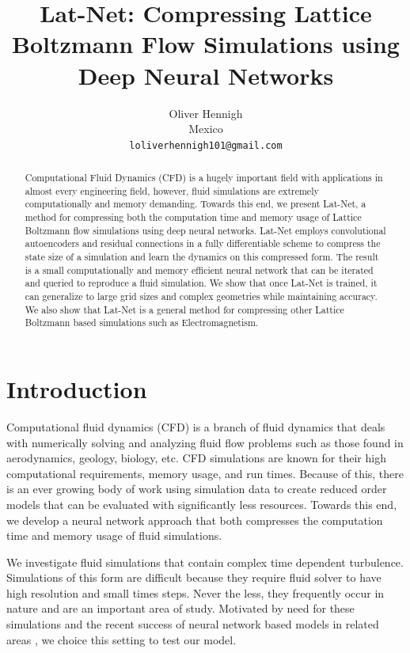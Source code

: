 \documentclass{article}
\title{Lat-Net: Compressing Lattice Boltzmann Flow Simulations using Deep Neural Networks}
\author{
  Oliver Hennigh \\
  Mexico \\
  \texttt{loliverhennigh101@gmail.com} \\
}
\begin{document}

\maketitle

\begin{abstract}
Computational Fluid Dynamics (CFD) is a hugely important field with applications in almost every engineering field, however, fluid simulations are extremely computationally and memory demanding. Towards this end, we present Lat-Net, a method for compressing both the computation time and memory usage of Lattice Boltzmann flow simulations using deep neural networks. Lat-Net employs convolutional autoencoders and residual connections in a fully differentiable scheme to compress the state size of a simulation and learn the dynamics on this compressed form. The result is a small computationally and memory efficient neural network that can be iterated and queried to reproduce a fluid simulation. We show that once Lat-Net is trained, it can generalize to large grid sizes and complex geometries while maintaining accuracy. We also show that Lat-Net is a general method for compressing other Lattice Boltzmann based simulations such as Electromagnetism.

\end{abstract}

\section{Introduction}

Computational fluid dynamics (CFD) is a branch of fluid dynamics that deals with numerically solving and analyzing fluid flow problems such as those found in aerodynamics, geology, biology, etc. CFD simulations are known for their high computational requirements, memory usage, and run times. Because of this, there is an ever growing body of work using simulation data to create reduced order models that can be evaluated with significantly less resources. Towards this end, we develop a neural network approach that both compresses the computation time and memory usage of fluid simulations.

We investigate fluid simulations that contain complex time dependent turbulence. Simulations of this form are difficult because they require fluid solver to have high resolution and small times steps. Never the less, they frequently occur in nature and are an important area of study. Motivated by need for these simulations and the recent success of neural network based models in related areas \cite{tompson2016accelerating} \cite{guo2016convolutional} \cite{yang2016data}, we choice this setting to test our model.
\end{document}
